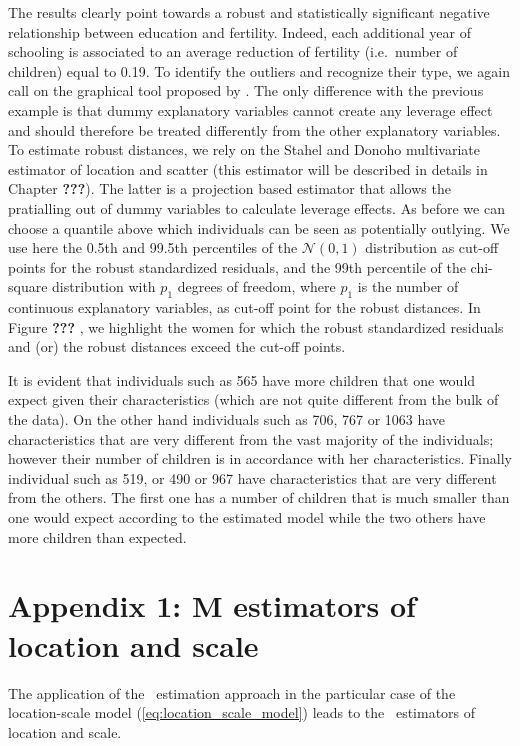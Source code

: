 The results clearly point towards a robust and statistically significant
negative relationship between education and fertility. Indeed, each additional
year of schooling is associated to an average reduction of fertility (i.e.\
number of children) equal to 0.19. To identify the outliers and recognize their
type, we again call on the graphical tool proposed by
\citet{rousseeuw:zomeren:1990}. The only difference with the previous example
is that dummy explanatory variables cannot create any leverage effect and
should therefore be treated differently from the other explanatory variables.
To estimate robust distances, we rely on the Stahel and Donoho multivariate
estimator of location and scatter (this estimator will be described in details
in Chapter \textbf{???}). The latter is a projection based estimator that allows
the pratialling out of dummy variables to calculate leverage effects. As before
we can choose a quantile above which individuals can be seen as potentially
outlying. We use here the 0.5th and 99.5th percentiles of the
$\mathcal{N}(0,1)$ distribution as cut-off points for the robust standardized
residuals, and the 99th percentile of the chi-square distribution with $p_1$
degrees of freedom, where $p_1$ is the number of continuous explanatory
variables, as cut-off point for the robust distances.
In Figure \textbf{???}%
, we highlight the women for which the robust standardized residuals and (or)
the robust distances exceed the cut-off points.

It is evident that individuals such as 565 have more children that one would
expect given their characteristics (which are not quite different
from the bulk of the data). On the other hand individuals such as 706, 767 or
1063 have characteristics that are very different from the vast majority of
the individuals; however their number of children is in accordance with her
characteristics. Finally individual such as 519, or 490 or 967 have
characteristics that are very different from the others. The first one has a
number of children that is much smaller than one would expect according to the
estimated model while the two others have more children than expected.


\section{Appendix 1: M estimators of location and scale}
\label{sec:robreg:appendix1}

The application of the ~estimation approach in the particular case of the
location-scale model (\ref{eq:location_scale_model}) leads to the \stsc{M}~estimators
of location and scale.

